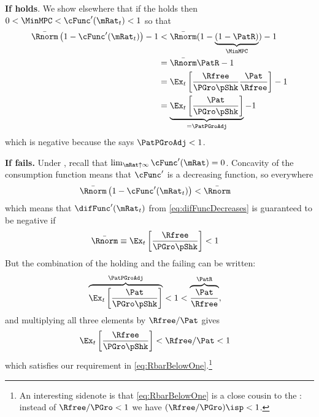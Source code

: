 \documentclass[BufferStockTheory]{subfiles}
\begin{document}
\textbf{If {\RIC} holds}.   We show elsewhere that if the {\RIC} holds then $0 < \MinMPC < \cFunc^{\prime}(\mRat_{t}) < 1$ so that 
\begin{align*}
  \bar{\Rnorm}\left(1-\cFunc^{\prime}({\mRat}_t)\right) - 1 & <  \bar{\Rnorm}(1-\underbrace{(1-\PatR)}_{\MinMPC}) - 1  \\
                                                            & = \bar{\Rnorm}\PatR - 1 \\
                                                            & = \Ex_{t}\left[\frac{\Rfree}{\PGro \pShk}\frac{\Pat}{\Rfree}\right] - 1 \\
                                                            & = \underbrace{\Ex_{t}\left[\frac{\Pat}{\PGro \pShk}\right]}_{= \PatPGroAdj} - 1 
\end{align*}
which is negative because the {\GIC} says $\PatPGroAdj < 1$.  

\textbf{If {\RIC} fails.}
Under \cncl{\RIC}, recall that $\lim_{\mRat \uparrow \infty} \cFunc^{\prime}(\mRat) = 0$.  Concavity of the consumption function means that $\cFunc^{\prime}$ is a decreasing function, so everywhere 
\begin{align*}
  \bar{\Rnorm}\left(1-\cFunc^{\prime}({\mRat}_t)\right) & < \bar{\Rnorm}
\end{align*}
which means that $\difFunc^{\prime}(\mRat_{t})$ from \eqref{eq:difFuncDecreases} is guaranteed to be negative if
\begin{equation}\begin{gathered}\begin{aligned}
  \bar{\Rnorm} \equiv \Ex_{t}\left[\frac{\Rfree}{\PGro \pShk}\right] & < 1  \label{eq:RbarBelowOne}
\end{aligned}\end{gathered}\end{equation}
But the combination of the {\GIC} holding and the {\RIC} failing can be written:
\begin{align*}
  \overbrace{\Ex_{t}\left[\frac{\Pat}{\PGro \pShk}\right]}^{\PatPGroAdj} & < 1 < \overbrace{\frac{\Pat}{\Rfree}}^{{\PatR}},
\end{align*}
and multiplying all three elements by $\Rfree/\Pat$ gives 
\begin{align*}
  \Ex_{t}\left[\frac{\Rfree}{\PGro \pShk}\right] & < \Rfree/\Pat < 1
\end{align*}
which satisfies our requirement in \eqref{eq:RbarBelowOne}.\footnote{An interesting sidenote is that \eqref{eq:RbarBelowOne} is a close cousin to the {\FHWC}: instead of $\Rfree/\PGro < 1$ we have $(\Rfree/\PGro)\isp < 1$.}
\end{document}
